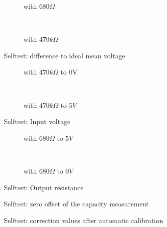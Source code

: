 \begin{figure}[H]
  \begin{subfigure}[b]{9cm}
    \centering
    \resizebox{9cm}{!}{}
    \caption{with \(680\Omega\)}
    \label{fig:SelfTMitL}
  \end{subfigure}
  ~
  \begin{subfigure}[b]{9cm}
    \centering
    \resizebox{9cm}{!}{}
    \caption{with \(470k\Omega\)}
    \label{fig:SelfTMitH}
  \end{subfigure}
  \caption{Selftest: difference to ideal mean voltage}
\end{figure}

\begin{figure}[H]
  \begin{subfigure}[b]{9cm}
  \centering
    \resizebox{9cm}{!}{}
    \caption{with \(470k\Omega\) to 0V}
    \label{fig:SelfTlowH}
  \end{subfigure}
  ~
  \begin{subfigure}[b]{9cm}
  \centering
    \resizebox{9cm}{!}{}
    \caption{with \(470k\Omega\) to \(5V\)}
    \label{fig:SelfTtopH}
  \end{subfigure}
  \caption{Selftest: Input voltage}
\end{figure}

\begin{figure}[H]
  \begin{subfigure}[b]{9cm}
  \centering
    \resizebox{9cm}{!}{}
    \caption{with \(680\Omega\) to \(5V\)}
    \label{fig:SelfTRoL}
  \end{subfigure}
  ~
  \begin{subfigure}[b]{9cm}
  \centering
    \resizebox{9cm}{!}{}
    \caption{with \(680\Omega\) to \(0V\)}
    \label{fig:SelfTRoH}
  \end{subfigure}
  \caption{Selftest: Output resistance}
\end{figure}

\begin{figure}[H]
  \centering
  \resizebox{9cm}{!}{}
  \caption{Selftest: zero offset of the capacity measurement}
  \label{fig:SelfTcap}
\end{figure}

\begin{figure}[H]
  \centering
  \resizebox{9cm}{!}{}
  \caption{Selftest: correction values after automatic calibration}
  \label{fig:SelfTrefKorr}
\end{figure}

